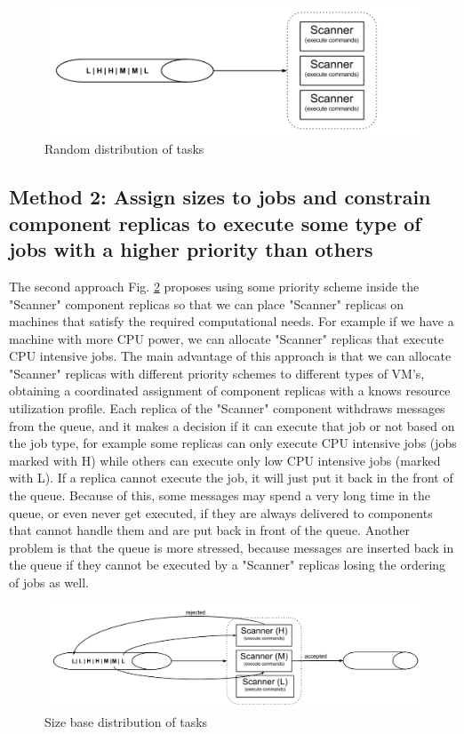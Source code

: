\begin{figure}[ht]
\centering
\includegraphics[width=\linewidth]{./img/1_NaturalLoadBalancing.png}
\caption{Random distribution of tasks}
\label{fig:randomDistributionsOfTasks}
\end{figure}

\subsection{Method 2: Assign sizes to jobs and constrain component replicas to execute some type of jobs with a higher priority than others}
\label{subsection:method2}
The second approach Fig. \ref{fig:sizeBaseDistributionOftasks} proposes using some priority scheme inside the "Scanner" component replicas so that we can place "Scanner" replicas on machines that satisfy the required computational needs. For example if we have a machine with more CPU power, we can allocate "Scanner" replicas that execute CPU intensive jobs. The main advantage of this approach is that we can allocate "Scanner" replicas with different priority schemes to different types of VM's, obtaining a coordinated assignment of component replicas with a knows resource utilization profile. Each replica of the "Scanner" component withdraws messages from the queue, and it makes a decision if it can execute that job or not based on the job type, for example some replicas can only execute CPU intensive jobs (jobs marked with H) while others can execute only low CPU intensive jobs (marked with L). If a replica cannot execute the job, it will just put it back in the front of the queue. Because of this, some messages may spend a very long time in the queue, or even never get executed, if they are always delivered to components that cannot handle them and are put back in front of the queue. Another problem is that the queue is more stressed, because messages are inserted back in the queue if they cannot be executed by a "Scanner" replicas losing the ordering of jobs as well.

\begin{figure}[ht]
\centering
\includegraphics[width=\linewidth]{./img/2_PriorityLoadBalancing.png}
\caption{Size base distribution of tasks}
\label{fig:sizeBaseDistributionOftasks}
\end{figure}


